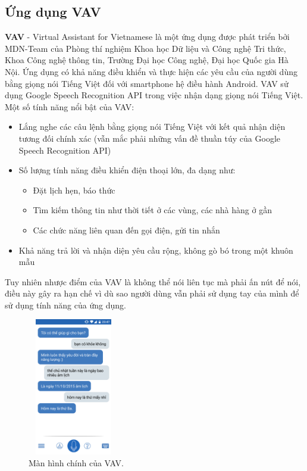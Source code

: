 \documentclass[12pt]{report}
\begin{document}
\subsection{Ứng dụng VAV}

\textbf{VAV} - Virtual Assistant for Vietnamese là một ứng dụng được phát triển bởi MDN-Team của Phòng thí nghiệm Khoa học Dữ liệu và Công nghệ Tri thức, Khoa Công nghệ thông tin, Trường Đại học Công nghệ, Đại học Quốc gia Hà Nội. Ứng dụng có khả năng điều khiển và thực hiện các yêu cầu của người dùng bằng giọng nói Tiếng Việt đối với smartphone hệ điều hành Android. VAV sử dụng Google Speech Recognition API trong việc nhận dạng giọng nói Tiếng Việt. Một số tính năng nổi bật của VAV:

\begin{itemize}
	\item Lắng nghe các câu lệnh bằng giọng nói Tiếng Việt với kết quả nhận diện tương đối chính xác (vẫn mắc phải những vấn đề thuần túy của Google Speech Recognition API)
	\item Số lượng tính năng điều khiển điện thoại lớn, đa dạng như:
	\begin{itemize}
		\item Đặt lịch hẹn, báo thức
		\item Tìm kiếm thông tin như thời tiết ở các vùng, các nhà hàng ở gần
		\item Các chức năng liên quan đến gọi điện, gửi tin nhắn
	\end{itemize}
	\item Khả năng trả lời và nhận diện yêu cầu rộng, không gò bó trong một khuôn mẫu
\end{itemize}

Tuy nhiên nhược điểm của VAV là không thể nói liên tục mà phải ấn nút để nói, điều này gây ra hạn chế vì dù sao người dùng vẫn phải sử dụng tay của mình để sử dụng tính năng của ứng dụng.

\begin{figure}[H]
	\centering
	\includegraphics[width=4cm, height=6cm]{Pics/Chap5/vav.png}
	\caption{Màn hình chính của VAV.}
\end{figure}
\end{document}
